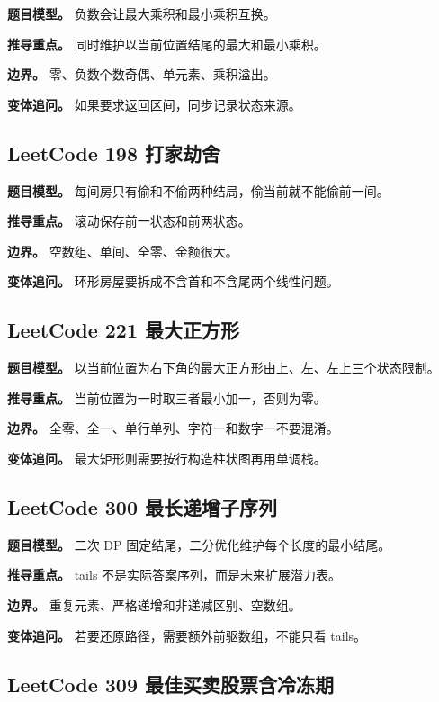 \textbf{题目模型。} 负数会让最大乘积和最小乘积互换。

\textbf{推导重点。} 同时维护以当前位置结尾的最大和最小乘积。

\textbf{边界。} 零、负数个数奇偶、单元素、乘积溢出。

\textbf{变体追问。} 如果要求返回区间，同步记录状态来源。

\subsection{LeetCode 198 打家劫舍}

\textbf{题目模型。} 每间房只有偷和不偷两种结局，偷当前就不能偷前一间。

\textbf{推导重点。} 滚动保存前一状态和前两状态。

\textbf{边界。} 空数组、单间、全零、金额很大。

\textbf{变体追问。} 环形房屋要拆成不含首和不含尾两个线性问题。

\subsection{LeetCode 221 最大正方形}

\textbf{题目模型。} 以当前位置为右下角的最大正方形由上、左、左上三个状态限制。

\textbf{推导重点。} 当前位置为一时取三者最小加一，否则为零。

\textbf{边界。} 全零、全一、单行单列、字符一和数字一不要混淆。

\textbf{变体追问。} 最大矩形则需要按行构造柱状图再用单调栈。

\subsection{LeetCode 300 最长递增子序列}

\textbf{题目模型。} 二次 DP 固定结尾，二分优化维护每个长度的最小结尾。

\textbf{推导重点。} tails 不是实际答案序列，而是未来扩展潜力表。

\textbf{边界。} 重复元素、严格递增和非递减区别、空数组。

\textbf{变体追问。} 若要还原路径，需要额外前驱数组，不能只看 tails。

\subsection{LeetCode 309 最佳买卖股票含冷冻期}


